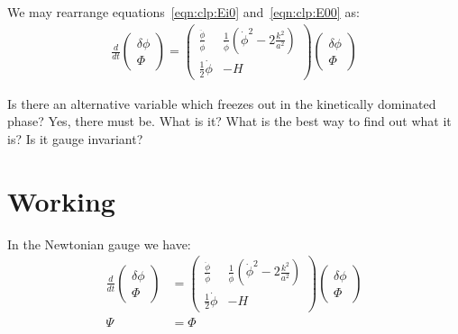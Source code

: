 We may rearrange equations~\eqref{eqn:clp:Ei0} and~\eqref{eqn:clp:E00} as:
\begin{align}
  \frac{d}{dt}
  \left(
  \begin{array}{c}
    \delta \phi \\
    \Phi
  \end{array}
  \right)
  =
  \left(%
  \begin{array}{cc}
    \frac{\ddot{\phi}}{\dot{\phi}} & \frac{1}{\dot{\phi}}\left( \dot{\phi}^2 - 2\frac{k^2}{a^2} \right) \\
    \frac{1}{2}\dot{\phi} & -H 
  \end{array}
  \right)
  \left(%
  \begin{array}{c}
    \delta \phi \\
    \Phi
  \end{array}
  \right)
\end{align}


Is there an alternative variable which freezes out in the kinetically dominated phase? Yes, there must be. What is it? What is the best way to find out what it is? Is it gauge invariant?


\section{Working}
In the Newtonian gauge we have:
\begin{align}
  \frac{d}{dt}
  \left(
  \begin{array}{c}
    \delta \phi \\
    \Phi
  \end{array}
  \right)
  &=
  \left(%
  \begin{array}{cc}
    \frac{\ddot{\phi}}{\dot{\phi}} & \frac{1}{\dot{\phi}}\left( \dot{\phi}^2 - 2\frac{k^2}{a^2} \right) \\
    \frac{1}{2}\dot{\phi} & -H 
  \end{array}
  \right)
  \left(%
  \begin{array}{c}
    \delta \phi \\
    \Phi
  \end{array}
  \right)\label{eqn:cls:fstodr}
  \\
  \Psi{} &= \Phi{}
\end{align}

